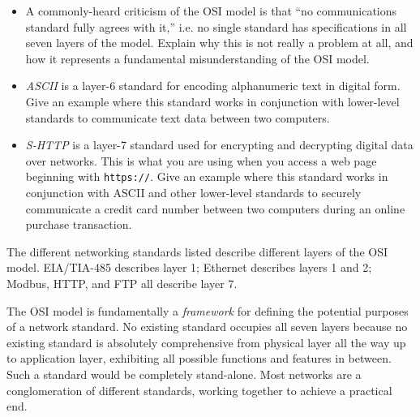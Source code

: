 \begin{itemize}
\item{} A commonly-heard criticism of the OSI model is that ``no communications standard fully agrees with it,'' i.e. no single standard has specifications in all seven layers of the model.  Explain why this is not really a problem at all, and how it represents a fundamental misunderstanding of the OSI model.
\item{} {\it ASCII} is a layer-6 standard for encoding alphanumeric text in digital form.  Give an example where this standard works in conjunction with lower-level standards to communicate text data between two computers.
\item{} {\it S-HTTP} is a layer-7 standard used for encrypting and decrypting digital data over networks.  This is what you are using when you access a web page beginning with {\tt https://}.  Give an example where this standard works in conjunction with ASCII and other lower-level standards to securely communicate a credit card number between two computers during an online purchase transaction.
\end{itemize}







The different networking standards listed describe different layers of the OSI model.  EIA/TIA-485 describes layer 1; Ethernet describes layers 1 and 2; Modbus, HTTP, and FTP all describe layer 7. 

\vskip 10pt

The OSI model is fundamentally a {\it framework} for defining the potential purposes of a network standard.  No existing standard occupies all seven layers because no existing standard is absolutely comprehensive from physical layer all the way up to application layer, exhibiting all possible functions and features in between.  Such a standard would be completely stand-alone.  Most networks are a conglomeration of different standards, working together to achieve a practical end.











